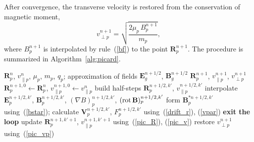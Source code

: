 \documentclass[final,3p]{elsarticle}
\newcommand{\rot}{\mbox{\rm{rot\,}}}
\begin{document}
After convergence, the transverse velocity is restored from the conservation of magnetic moment,
\begin{equation}\label{pic_vp}
    v_{\perp p}^{n+1}=\sqrt{\frac{2\mu_p\,B_p^{n+1}}{m_p}},
\end{equation}
where $B_p^{n+1}$ is interpolated by rule~(\ref{bf}) to the point $\mathbf{R}_p^{n+1}$. The procedure is summarized in Algorithm~\ref{alg:picard}.
 
\begin{algorithm}[H]
\caption{Inner loop: Picard method for a guiding center}
\label{alg:picard}
\begin{algorithmic}[1]
\Require $\mathbf{R}_p^n$, $v_{\|p}^n$, $\mu_p$, $m_p$, $q_p$; approximation of fields $\mathbf{E}_g^{n+1/2}$, $\mathbf{B}_g^{n+1/2}$
\Ensure $\mathbf{R}_p^{n+1}$, $v_{\|p}^{n+1}$, $v_{\perp p}^{n+1}$
\State $\mathbf{R}_p^{n+1,0}\gets\mathbf{R}_p^n$, \enspace $v_{\|p}^{n+1,0}\gets v_{\|p}^n$
    \State build half-steps $\mathbf{R}_p^{n+1/2,k'}$, $v_{\|p}^{n+1/2,k'}$
    \State interpolate $\mathbf{E}_p^{n+1/2,k'}$, $\mathbf{B}_p^{n+1/2,k'}$, $(\nabla B)_p^{n+1/2,k'}$, $(\rot\mathbf{B})_p^{n+1/2,k'}$ \Comment{(\ref{ef}), (\ref{bf}), (\ref{gradB}), (\ref{rotB})}
    \State form $\mathbf{B}_p^{\ast n+1/2,k'}$ using~(\ref{bstar}); calculate $\mathbf{V}_p^{n+1/2,k'}$, $F_p^{n+1/2,k'}$ using~(\ref{drift_r}), (\ref{vpar})
     \State \textbf{exit the loop} \EndIf
    \State update $\mathbf{R}_p^{n+1,k'+1}$, $v_{\|p}^{n+1,k'+1}$ using~(\ref{pic_R}), (\ref{pic_v})
\EndFor
\State restore $v_{\perp p}^{n+1}$ using~(\ref{pic_vp})
\end{algorithmic}
\end{algorithm}
 
\end{document}
